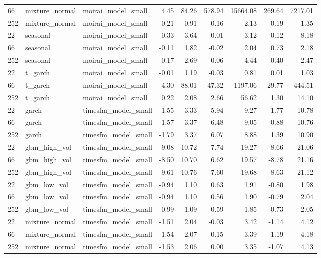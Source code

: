 {\begin{tabular}{lllrrrrrr}
66 & mixture\_normal & moirai\_model\_small & 4.45 & 84.26 & 578.94 & 15664.08 & 269.64 & 7217.01 \\
252 & mixture\_normal & moirai\_model\_small & -0.21 & 0.91 & -0.16 & 2.13 & -0.19 & 1.35 \\
\midrule
22 & seasonal & moirai\_model\_small & -0.33 & 3.64 & 0.01 & 3.12 & -0.12 & 8.18 \\
66 & seasonal & moirai\_model\_small & -0.11 & 1.82 & -0.02 & 2.04 & 0.73 & 2.18 \\
252 & seasonal & moirai\_model\_small & 0.17 & 2.69 & 0.06 & 4.44 & 0.40 & 2.47 \\
\midrule
22 & t\_garch & moirai\_model\_small & -0.01 & 1.19 & -0.03 & 0.81 & 0.01 & 1.03 \\
66 & t\_garch & moirai\_model\_small & 4.30 & 88.01 & 47.32 & 1197.06 & 29.77 & 444.51 \\
252 & t\_garch & moirai\_model\_small & 0.22 & 2.08 & 2.66 & 56.62 & 1.30 & 14.10 \\
\midrule
22 & garch & timesfm\_model\_small & -1.55 & 3.33 & 5.94 & 9.27 & 1.77 & 10.78 \\
66 & garch & timesfm\_model\_small & -1.57 & 3.37 & 6.48 & 9.05 & 0.88 & 10.76 \\
252 & garch & timesfm\_model\_small & -1.79 & 3.37 & 6.07 & 8.88 & 1.39 & 10.90 \\
\midrule
22 & gbm\_high\_vol & timesfm\_model\_small & -9.08 & 10.72 & 7.74 & 19.27 & -8.66 & 21.06 \\
66 & gbm\_high\_vol & timesfm\_model\_small & -8.50 & 10.70 & 6.62 & 19.57 & -8.78 & 21.16 \\
252 & gbm\_high\_vol & timesfm\_model\_small & -9.61 & 10.76 & 7.60 & 19.68 & -8.63 & 21.12 \\
\midrule
22 & gbm\_low\_vol & timesfm\_model\_small & -0.94 & 1.10 & 0.63 & 1.91 & -0.80 & 1.98 \\
66 & gbm\_low\_vol & timesfm\_model\_small & -0.94 & 1.10 & 0.56 & 1.90 & -0.79 & 2.04 \\
252 & gbm\_low\_vol & timesfm\_model\_small & -0.99 & 1.09 & 0.59 & 1.85 & -0.73 & 2.05 \\
\midrule
22 & mixture\_normal & timesfm\_model\_small & -1.51 & 2.04 & -0.03 & 3.42 & -1.14 & 4.12 \\
66 & mixture\_normal & timesfm\_model\_small & -1.54 & 2.07 & 0.15 & 3.39 & -1.19 & 4.18 \\
252 & mixture\_normal & timesfm\_model\_small & -1.53 & 2.06 & 0.00 & 3.35 & -1.07 & 4.13 \\

\end{tabular}}
